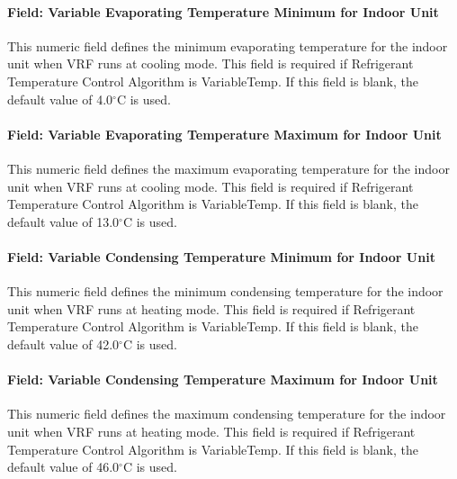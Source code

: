 \paragraph{Field: Variable Evaporating Temperature Minimum for Indoor Unit}\label{field-variable-evaporating-temperature-minimum-for-indoor-unit}

This numeric field defines the minimum evaporating temperature for the indoor unit when VRF runs at cooling mode. This field is required if Refrigerant Temperature Control Algorithm is VariableTemp. If this field is blank, the default value of 4.0$^\circ$C is used.

\paragraph{Field: Variable Evaporating Temperature Maximum for Indoor Unit}\label{field-variable-evaporating-temperature-maximum-for-indoor-unit}

This numeric field defines the maximum evaporating temperature for the indoor unit when VRF runs at cooling mode. This field is required if Refrigerant Temperature Control Algorithm is VariableTemp. If this field is blank, the default value of 13.0$^\circ$C is used.

\paragraph{Field: Variable Condensing Temperature Minimum for Indoor Unit}\label{field-variable-condensing-temperature-minimum-for-indoor-unit}

This numeric field defines the minimum condensing temperature for the indoor unit when VRF runs at heating mode. This field is required if Refrigerant Temperature Control Algorithm is VariableTemp. If this field is blank, the default value of 42.0$^\circ$C is used.

\paragraph{Field: Variable Condensing Temperature Maximum for Indoor Unit}\label{field-variable-condensing-temperature-maximum-for-indoor-unit}

This numeric field defines the maximum condensing temperature for the indoor unit when VRF runs at heating mode. This field is required if Refrigerant Temperature Control Algorithm is VariableTemp. If this field is blank, the default value of 46.0$^\circ$C is used.

